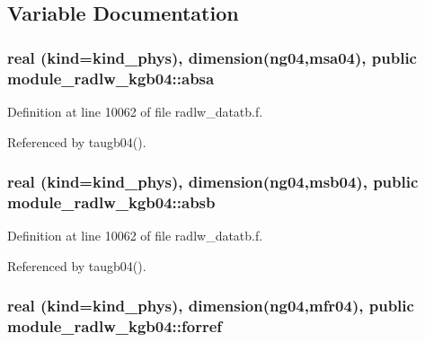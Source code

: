 \subsection{Variable Documentation}
\subsubsection[{\texorpdfstring{absa}{absa}}]{\setlength{\rightskip}{0pt plus 5cm}real (kind=kind\+\_\+phys), dimension(ng04,{\bf msa04}), public module\+\_\+radlw\+\_\+kgb04\+::absa}\hypertarget{namespacemodule__radlw__kgb04_a8d73bb6971c872e15a24a81d3917167e}{}\label{namespacemodule__radlw__kgb04_a8d73bb6971c872e15a24a81d3917167e}


Definition at line 10062 of file radlw\+\_\+datatb.\+f.



Referenced by taugb04().

\subsubsection[{\texorpdfstring{absb}{absb}}]{\setlength{\rightskip}{0pt plus 5cm}real (kind=kind\+\_\+phys), dimension(ng04,{\bf msb04}), public module\+\_\+radlw\+\_\+kgb04\+::absb}\hypertarget{namespacemodule__radlw__kgb04_aaacc55911b42c67396b5cdc4318e0d5f}{}\label{namespacemodule__radlw__kgb04_aaacc55911b42c67396b5cdc4318e0d5f}


Definition at line 10062 of file radlw\+\_\+datatb.\+f.



Referenced by taugb04().

\subsubsection[{\texorpdfstring{forref}{forref}}]{\setlength{\rightskip}{0pt plus 5cm}real (kind=kind\+\_\+phys), dimension(ng04,{\bf mfr04}), public module\+\_\+radlw\+\_\+kgb04\+::forref}\hypertarget{namespacemodule__radlw__kgb04_a816fd065291a92c13d026d38a708479b}{}\label{namespacemodule__radlw__kgb04_a816fd065291a92c13d026d38a708479b}


